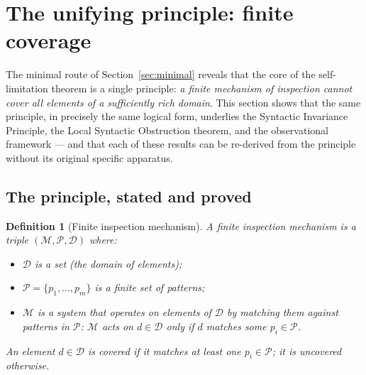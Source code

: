 \documentclass[11pt]{article}
\newtheorem{definition}[theorem]{Definition}
\begin{document}
\section{The unifying principle: finite coverage}
\label{sec:unifying}


The minimal route of Section~\ref{sec:minimal} reveals that the core of
the self-limitation theorem is a single principle: \emph{a finite
mechanism of inspection cannot cover all elements of a sufficiently rich
domain}. This section shows that the same principle, in precisely the
same logical form, underlies the Syntactic Invariance Principle, the
Local Syntactic Obstruction theorem, and the observational framework ---
and that each of these results can be re-derived from the principle
without its original specific apparatus.

\subsection{The principle, stated and proved}

\begin{definition}[Finite inspection mechanism]
\label{def:mechanism}
A \emph{finite inspection mechanism} is a triple
$(\mathcal{M}, \mathcal{P}, \mathcal{D})$ where:
\begin{itemize}
  \item $\mathcal{D}$ is a set (the domain of elements);
  \item $\mathcal{P} = \{p_1, \ldots, p_m\}$ is a finite set of
        patterns;
  \item $\mathcal{M}$ is a system that operates on elements of
        $\mathcal{D}$ by matching them against patterns in $\mathcal{P}$:
        $\mathcal{M}$ acts on $d \in \mathcal{D}$ only if $d$ matches
        some $p_i \in \mathcal{P}$.
\end{itemize}
An element $d \in \mathcal{D}$ is \emph{covered} if it matches at least
one $p_i \in \mathcal{P}$; it is \emph{uncovered} otherwise.
\end{definition}
\end{document}
